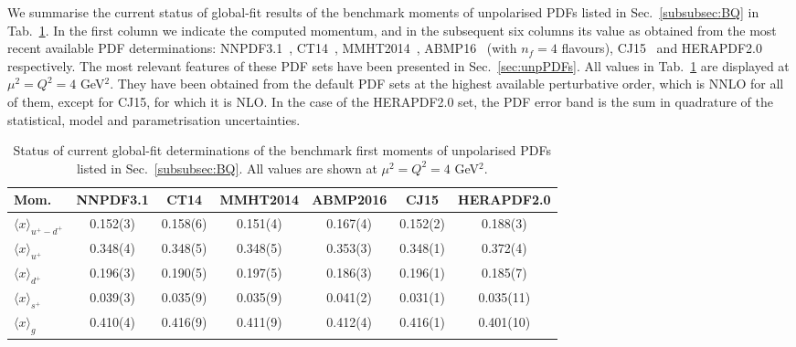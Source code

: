 We summarise the current status of global-fit results of the benchmark
moments of unpolarised PDFs listed in Sec.~\ref{subsubsec:BQ} 
in Tab.~\ref{tab:unpPDFmoms}.
%
In the first column we indicate the computed momentum, and in the subsequent 
six columns its value as obtained from the most recent available PDF 
determinations: NNPDF3.1~\cite{Ball:2017nwa},
CT14~\cite{Dulat:2015mca}, MMHT2014~\cite{Harland-Lang:2014zoa},
ABMP16~\cite{Alekhin:2017kpj} (with $n_f=4$ flavours), 
CJ15~\cite{Accardi:2016qay} and 
HERAPDF2.0~\cite{Abramowicz:2015mha} respectively.
%
The most relevant features of these PDF sets have been presented in 
Sec.~\ref{sec:unpPDFs}.
%
All values in Tab.~\ref{tab:unpPDFmoms} are displayed
at $\mu^2=Q^2=4$ GeV$^2$. 
%
They have been obtained from the default PDF sets at the highest available 
perturbative order, which is NNLO for all of them, except for CJ15, 
for which it is NLO.
%
%
In the case of the HERAPDF2.0 set, the PDF error band is the sum in quadrature 
of the statistical, model and parametrisation uncertainties.

\begin{table}[t]
\centering
\begin{tabular}{lcccccc}
\toprule
Mom. 
& NNPDF3.1 & CT14 & MMHT2014 & ABMP2016 & CJ15 & HERAPDF2.0 \\
\midrule
$\langle x \rangle_{u^+-d^+}$ 
& 0.152(3) & 0.158(6) & 0.151(4) & 0.167(4) & 0.152(2) & 0.188(3)\\
$\langle x \rangle_{u^+}$    
& 0.348(4) & 0.348(5) & 0.348(5) & 0.353(3) & 0.348(1) & 0.372(4)\\
$\langle x \rangle_{d^+}$    
& 0.196(3) & 0.190(5) & 0.197(5) & 0.186(3) & 0.196(1) & 0.185(7)\\
$\langle x \rangle_{s^+}$    
& 0.039(3) & 0.035(9) & 0.035(9) & 0.041(2) & 0.031(1) & 0.035(11)\\
$\langle x \rangle_{g}$     
& 0.410(4) & 0.416(9) & 0.411(9) & 0.412(4) & 0.416(1) & 0.401(10)\\
\bottomrule
\end{tabular}
\caption{\small Status of current global-fit determinations of the 
benchmark first moments of unpolarised PDFs listed in Sec.~\ref{subsubsec:BQ}.
All values are shown at $\mu^2=Q^2=4$ GeV$^2$.}
\label{tab:unpPDFmoms}
\end{table}

